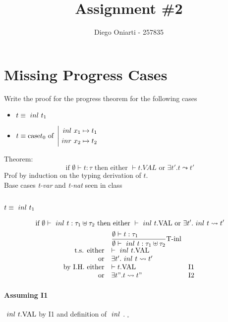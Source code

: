 \documentclass{article}
\title{Assignment \#2}
\author{Diego Oniarti - 257835}
\date{}
\begin{document}
\maketitle

\section{Missing Progress Cases}
Write the proof for the progress theorem for the following cases
\begin{itemize}
    \item $t \equiv \ inl\  t_1$
    \item $t \equiv \text{case}t_0\ \text{of}\ \left|\begin{aligned}\ inl\  x_1 \mapsto t_1\\\ inr\  x_2 \mapsto t_2\end{aligned}\right.$
\end{itemize}

Theorem:
\[
    \text{ if } \emptyset \vdash t:\tau \text{ then either } \vdash t.VAL \text{ or } \exists t'.t\leadsto t'
\] 
Prof by induction on the typing derivation of $t$.\\
Base cases \textit{t-var} and \textit{t-nat} seen in class

\subsection{$t \equiv \ inl\  t_1$}
\[
    \text{ if } \emptyset \vdash \ inl\  t:\tau_1\uplus\tau_2 \text{ then either } \vdash \ inl\  t.\text{VAL} \text{ or } \exists t'.\ inl\  t\leadsto t'
\] 
\[
    \begin{array}{rl @{\quad} l}
                             &  \st[T-inl]{\emptyset\vdash \inl t: \tau_1\uplus\tau_2}{\emptyset\vdash t:\tau_1}  \\
        \text{t.s. either}   &   \vdash \inl t.\text{VAL} \\
        \text{or}            &   \exists t'.\inl t \leadsto t' \\
        \text{by I.H. either}&   \vdash t.\text{VAL}                 & \text{I1} \\
        \text{or}            &   \exists t".t \leadsto t"            & \text{I2} \\
    \end{array}
\]

\paragraph{Assuming I1}
$\ inl\  t.\text{VAL}$ by I1 and definition of $\ inl\ $. $_\square$
\end{document}
